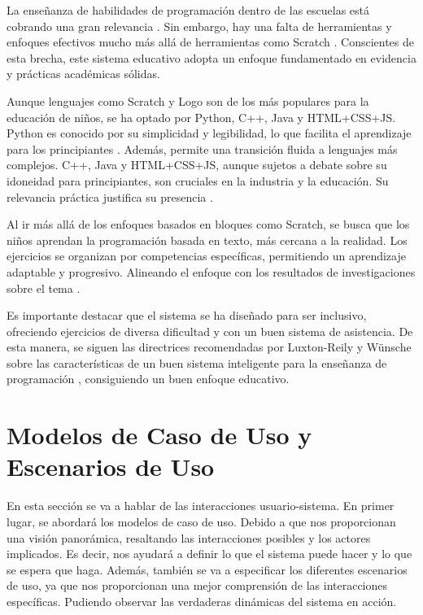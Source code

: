 La enseñanza de habilidades de programación dentro de las escuelas está cobrando una gran relevancia \cite{teachingcodingchildren}. Sin embargo, hay una falta de herramientas y enfoques efectivos mucho más allá de herramientas como Scratch \cite{teachingcodingchildren}. Conscientes de esta brecha, este sistema educativo adopta un enfoque fundamentado en evidencia y prácticas académicas sólidas.

Aunque lenguajes como Scratch y Logo son de los más populares para la educación de niños, se ha optado por Python, C++, Java y HTML+CSS+JS. Python es conocido por su simplicidad y legibilidad, lo que facilita el aprendizaje para los principiantes \cite{pears2007}. Además, permite una transición fluida a lenguajes más complejos. C++, Java y HTML+CSS+JS, aunque sujetos a debate sobre su idoneidad para principiantes, son cruciales en la industria y la educación. Su relevancia práctica justifica su presencia \cite{dewarschonberg}.

Al ir más allá de los enfoques basados en bloques como Scratch, se busca que los niños aprendan la programación basada en texto, más cercana a la realidad. Los ejercicios se organizan por competencias específicas, permitiendo un aprendizaje adaptable y progresivo. Alineando el enfoque con los resultados de investigaciones sobre el tema \cite{document2010}. 

Es importante destacar que el sistema se ha diseñado para ser inclusivo, ofreciendo ejercicios de diversa dificultad y con un buen sistema de asistencia. De esta manera, se siguen las directrices recomendadas por Luxton-Reily y Wünsche sobre las características de un buen sistema inteligente para la enseñanza de programación \cite{intelligentturoingprogrammingeducation}, consiguiendo un buen enfoque educativo.

\section{Modelos de Caso de Uso y Escenarios de Uso}

En esta sección se va a hablar de las interacciones usuario-sistema. En primer lugar, se abordará los modelos de caso de uso. Debido a que nos proporcionan una visión panorámica, resaltando las interacciones posibles y los actores implicados. Es decir, nos ayudará a definir lo que el sistema puede hacer y lo que se espera que haga. Además, también se va a especificar los diferentes escenarios de uso, ya que nos proporcionan una mejor comprensión de las interacciones específicas. Pudiendo observar las verdaderas dinámicas del sistema en acción.


